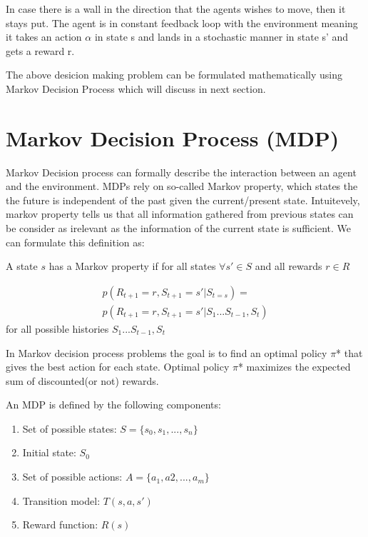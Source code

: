 \documentclass[10pt,a4paper,twocolumn]{article}
\begin{document}
	

	In case there is a wall in the direction that the agents wishes to move, then it stays put.
	The agent is in constant feedback loop with the environment meaning it takes an action $\alpha$ in state s and lands in a stochastic manner in state s’ and gets a reward r.
	
	The above desicion making problem can be formulated mathematically using Markov Decision Process which will discuss in next section.
	
	\section{Markov Decision Process (MDP)}
	
	Markov Decision process can formally describe the interaction between an agent and the environment. MDPs rely on so-called Markov property, which states the the future is independent of the past given the current/present state. Intuitevely, markov property tells us that all information gathered from previous states can be consider as irelevant as the information of the current state is sufficient. We can formulate this definition as:
	
	A state $s$ has a Markov property if for all states $\forall{s'} \in S$ and all rewards $r \in R$
	
	\begin{equation}
		\begin{split}
			p(R_{t+1} = r , S_{t+1}=s' | S_{t=s}) = \\ 
		 	p(R_{t+1} = r , S_{t+1}=s' | S_{1} ... S_{t-1}, S_{t})
		\end{split}
	\end{equation}
	for all possible histories $ S_{1} ... S_{t-1}, S_{t} $
	
	
	In Markov decision process problems the goal is to find an optimal policy $\pi$* that gives  the best action for each state. Optimal policy $\pi$* maximizes the expected sum of discounted(or not) rewards.
	
	An MDP is defined by the following components:
	\begin{enumerate}
		\item Set of possible states: $S = \{ s_{0}, s_{1}, ..., s_{n} \}$
		\item Initial state: $S_{0}$
		\item Set of possible actions: $A = \{ a_{1}, a{2}, ..., a_{m} \}$
		\item Transition model: $T(s, a, s')$
		\item Reward function: $R(s)$
	\end{enumerate}
\end{document}
